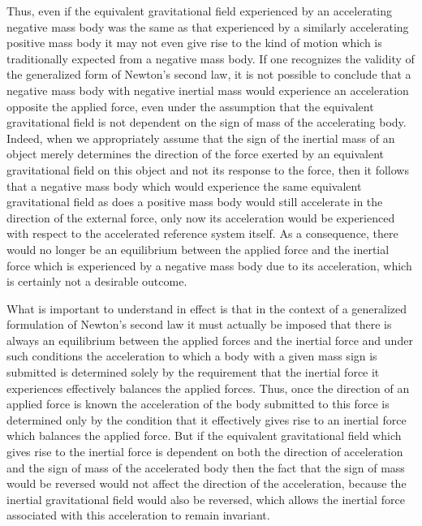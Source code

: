 \documentclass[notitlepage,12pt]{report}
\begin{document}
Thus, even if the equivalent gravitational field experienced by an accelerating negative mass body was the same as that experienced by a similarly accelerating positive mass body it may not even give rise to the kind of motion which is traditionally expected from a negative mass body. If one recognizes the validity of the generalized form of Newton's second law, it is not possible to conclude that a negative mass body with negative inertial mass would experience an acceleration opposite the applied force, even under the assumption that the equivalent gravitational field is not dependent on the sign of mass of the accelerating body. Indeed, when we appropriately assume that the sign of the inertial mass of an object merely determines the direction of the force exerted by an equivalent gravitational field on this object and not its response to the force, then it follows that a negative mass body which would experience the same equivalent gravitational field as does a positive mass body would still accelerate in the direction of the external force, only now its acceleration would be experienced with respect to the accelerated reference system itself. As a consequence, there would no longer be an equilibrium between the applied force and the inertial force which is experienced by a negative mass body due to its acceleration, which is certainly not a desirable outcome.

What is important to understand in effect is that in the context of a generalized formulation of Newton's second law it must actually be imposed that there is always an equilibrium between the applied forces and the inertial force and under such conditions the acceleration to which a body with a given mass sign is submitted is determined solely by the requirement that the inertial force it experiences effectively balances the applied forces. Thus, once the direction of an applied force is known the acceleration of the body submitted to this force is determined only by the condition that it effectively gives rise to an inertial force which balances the applied force. But if the equivalent gravitational field which gives rise to the inertial force is dependent on both the direction of acceleration and the sign of mass of the accelerated body then the fact that the sign of mass would be reversed would not affect the direction of the acceleration, because the inertial gravitational field would also be reversed, which allows the inertial force associated with this acceleration to remain invariant.
\end{document}
